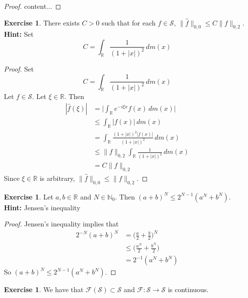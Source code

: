 \documentclass[12pt]{amsart}
\theoremstyle{definition}
\newtheorem{ex}[definition]{Exercise}
\newcommand{\N}{\mathbb{N}}
\newcommand{\R}{\mathbb{R}}
\newcommand{\MF}{\mathcal{F}}
\newcommand{\MS}{\mathcal{S}}
\newcommand{\dm}{\, d m}
\begin{document}
	\begin{proof}
		content...
	\end{proof}

	\begin{ex}
		There exists $C >0$ such that for each $f \in \MS$, $\|\hat{f}\|_{0,0} \leq C \|f\|_{0, 2}$.\\
		\textbf{Hint:} Set $$C = \int_{\R} \frac{1}{(1+|x|)^2} \dm(x)$$
	\end{ex}
	
	\begin{proof}
		Set 
		$$C = \int_{\R} \frac{1}{(1+|x|)^2} \dm(x)$$
		Let $f \in \MS$. Let $\xi \in \R$. Then 
		\begin{align*}
			|\hat{f}(\xi)| 
			& = \bigg| \int_{\R} e^{-i\xi x} f(x) \dm(x) \bigg| \\
			& \leq  \int_{\R} | f(x)| \dm(x) \\
			& =  \int_{\R} \frac{(1+|x|)^2|f(x)|}{(1+|x|)^2} \dm(x) \\
			& \leq \|f\|_{0, 2} \int_{\R} \frac{1}{(1+|x|)^2} \dm(x) \\
			& = C\|f\|_{0, 2}
		\end{align*}
		Since $\xi \in \R$ is arbitrary, $\|\hat{f}\|_{0,0} \leq \|f\|_{0, 2}$.
	\end{proof}

	\begin{ex}
		Let $a, b \in \R$ and $N \in \N_0$. Then $(a + b)^N \leq 2^{N-1} (a^N + b^N)$. \\
		\textbf{Hint:} Jensen's inequality
	\end{ex}
	
	\begin{proof}
		Jensen's inequality implies that 
		\begin{align*}
			2^{-N}(a + b)^N 
			& = \bigg(\frac{a}{2} + \frac{b}{2} \bigg)^N \\
			& \leq \bigg(\frac{a^N}{2} + \frac{b^N}{2} \bigg) \\
			& = 2^{-1}(a^N + b^N)
		\end{align*}
	So $(a + b)^N \leq 2^{N-1} (a^N + b^N)$.
	\end{proof}

	\begin{ex}
		We have that $ \MF(\MS) \subset \MS$ and $\MF: \MS \rightarrow \MS$ is continuous. 
	\end{ex}
\end{document}

